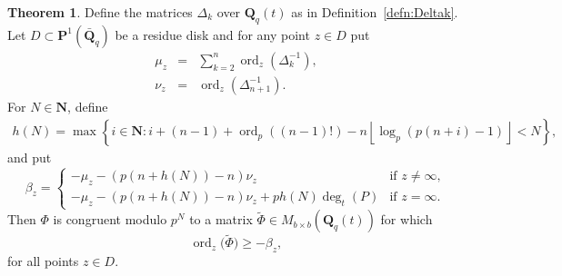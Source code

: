 \documentclass[a4paper,11pt]{article}
\numberwithin{equation}{section}
\providecommand{\floor}[1]{\left\lfloor#1\right\rfloor}   %
\newcommand{\NN}{\mathbf{N}} %
\newcommand{\QQ}{\mathbf{Q}} %
\DeclareMathOperator{\ord}{ord}          %
\theoremstyle{definition}
\newtheorem{thm}{Theorem}[section]
\begin{document}
\begin{thm} \label{thm:Gerkmann}
Define the matrices $\Delta_k$ over $\QQ_q(t)$ as in 
Definition~\ref{defn:Deltak}.
Let $D \subset \mathbf{P}^1(\bar{\QQ}_q)$ be a residue disk
and for any point $z \in D$ put
\begin{eqnarray*}
\mu_z &=& \sum_{k=2}^n \ord_z\left(\Delta_k^{-1}\right), \\
\nu_z &=& \ord_z\left(\Delta_{n+1}^{-1}\right).
\end{eqnarray*}
For $N \in \NN$, define 
\begin{align*}
h(N) = \max \left\{ i \in \NN : i+(n-1)+\ord_p ((n-1)!)-n \floor{\log_p(p(n+i)-1)} < N \right\},
\end{align*}
and put
\[
\beta_z = \begin{cases}
-\mu_z -(p(n+h(N))-n) \nu_z & \mbox{if $z \neq \infty$}, \\
-\mu_z -(p(n+h(N))-n) \nu_z + p h(N) \deg_t(P) & \mbox{if $z = \infty$}.
\end{cases}
\]
Then $\Phi$ is congruent modulo $p^N$ to a matrix 
$\tilde{\Phi} \in M_{b \times b}(\QQ_q(t))$ for which
\begin{equation*}
\ord_z\bigl(\tilde{\Phi}\bigr) \geq -\beta_z,
\end{equation*}
for all points $z \in D$.
\end{thm}
\end{document}
